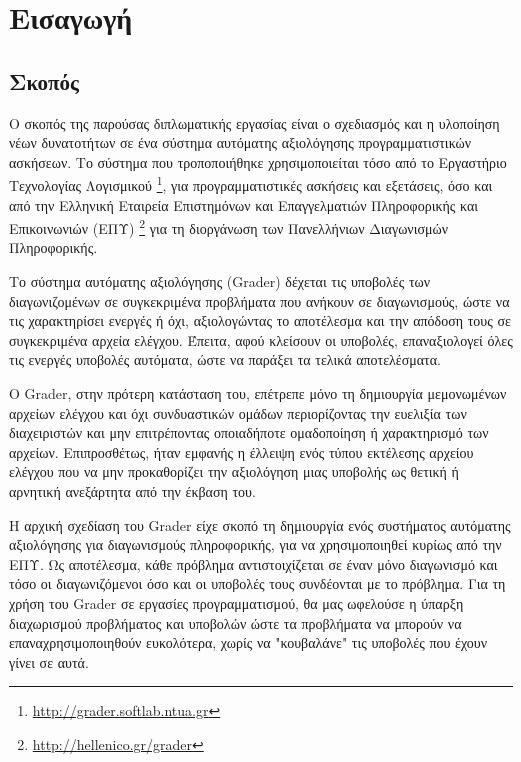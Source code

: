 \documentclass[diploma]{softlab-thesis}
\begin{document}

\mainmatter

\chapter{Εισαγωγή}

\section{Σκοπός}

Ο σκοπός της παρούσας διπλωματικής εργασίας είναι ο σχεδιασμός και η υλοποίηση
νέων δυνατοτήτων σε ένα σύστημα αυτόματης αξιολόγησης προγραμματιστικών
ασκήσεων. Το σύστημα που τροποποιήθηκε χρησιμοποιείται τόσο από το Εργαστήριο
Τεχνολογίας Λογισμικού \footnote{\url{http://grader.softlab.ntua.gr}}, για
προγραμματιστικές ασκήσεις και εξετάσεις, όσο και από την Ελληνική Εταιρεία
Επιστημόνων και Επαγγελματιών Πληροφορικής και Επικοινωνιών (ΕΠΥ)
\footnote{\url{http://hellenico.gr/grader}} για τη διοργάνωση των Πανελλήνιων
Διαγωνισμών Πληροφορικής.

\bigskip

Το σύστημα αυτόματης αξιολόγησης (Grader) δέχεται τις υποβολές των
διαγωνιζομένων σε συγκεκριμένα προβλήματα που ανήκουν σε διαγωνισμούς, ώστε να
τις χαρακτηρίσει ενεργές ή όχι, αξιολογώντας το αποτέλεσμα και την απόδοση τους
σε συγκεκριμένα αρχεία ελέγχου. Έπειτα, αφού κλείσουν οι υποβολές,
επαναξιολογεί όλες τις ενεργές υποβολές αυτόματα, ώστε να παράξει τα τελικά
αποτελέσματα.

\bigskip

Ο Grader, στην πρότερη κατάσταση του, επέτρεπε μόνο τη δημιουργία μεμονωμένων
αρχείων ελέγχου και όχι συνδυαστικών ομάδων περιορίζοντας την ευελιξία των
διαχειριστών και μην επιτρέποντας οποιαδήποτε ομαδοποίηση ή χαρακτηρισμό των
αρχείων. Επιπροσθέτως, ήταν εμφανής η έλλειψη ενός τύπου εκτέλεσης αρχείου ελέγχου
που να μην προκαθορίζει την αξιολόγηση μιας υποβολής ως θετική ή αρνητική ανεξάρτητα
από την έκβαση του.

\bigskip

Η αρχική σχεδίαση του Grader είχε σκοπό τη δημιουργία ενός συστήματος αυτόματης
αξιολόγησης για διαγωνισμούς πληροφορικής, για να χρησιμοποιηθεί κυρίως από την
ΕΠΥ. Ως αποτέλεσμα, κάθε πρόβλημα αντιστοιχίζεται σε έναν μόνο διαγωνισμό και τόσο
οι διαγωνιζόμενοι όσο και οι υποβολές τους συνδέονται με το πρόβλημα. Για τη χρήση
του Grader σε εργασίες προγραμματισμού, θα μας ωφελούσε η ύπαρξη διαχωρισμού
προβλήματος και υποβολών ώστε τα προβλήματα να μπορούν να επαναχρησιμοποιηθούν
ευκολότερα, χωρίς να "κουβαλάνε" τις υποβολές που έχουν γίνει σε αυτά.
\end{document}
